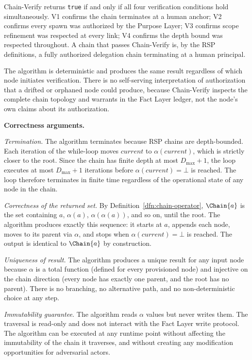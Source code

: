 Chain-Verify returns \texttt{true} if and only if all four verification conditions hold simultaneously. V1 confirms the chain terminates at a human anchor; V2 confirms every spawn was authorized by the Purpose Layer; V3 confirms scope refinement was respected at every link; V4 confirms the depth bound was respected throughout. A chain that passes Chain-Verify is, by the RSP definitions, a fully authorized delegation chain terminating at a human principal.

The algorithm is deterministic and produces the same result regardless of which node initiates verification. There is no self-serving interpretation of authorization that a drifted or orphaned node could produce, because Chain-Verify inspects the complete chain topology and warrants in the Fact Layer ledger, not the node's own claims about its authorization.

\medskip
\noindent\textbf{Correctness arguments.}

\textit{Termination.} The algorithm terminates because RSP chains are depth-bounded. Each iteration of the while-loop moves $current$ to $\alpha(current)$, which is strictly closer to the root. Since the chain has finite depth at most $D_{\max} + 1$, the loop executes at most $D_{\max} + 1$ iterations before $\alpha(current) = \bot$ is reached. The loop therefore terminates in finite time regardless of the operational state of any node in the chain.

\textit{Correctness of the returned set.} By Definition~\ref{dfn:chain-operator}, $\Chain{a}$ is the set containing $a$, $\alpha(a)$, $\alpha(\alpha(a))$, and so on, until the root. The algorithm produces exactly this sequence: it starts at $a$, appends each node, moves to its parent via $\alpha$, and stops when $\alpha(current) = \bot$ is reached. The output is identical to $\Chain{a}$ by construction.

\textit{Uniqueness of result.} The algorithm produces a unique result for any input node because $\alpha$ is a total function (defined for every provisioned node) and injective on the chain direction (every node has exactly one parent, and the root has no parent). There is no branching, no alternative path, and no non-deterministic choice at any step.

\textit{Immutability guarantee.} The algorithm reads $\alpha$ values but never writes them. The traversal is read-only and does not interact with the Fact Layer write protocol. The algorithm can be executed at any runtime point without affecting the immutability of the chain it traverses, and without creating any modification opportunities for adversarial actors.

